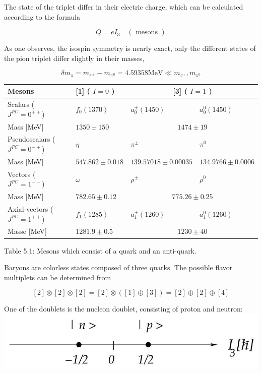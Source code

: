 \documentclass[10pt, letterpaper]{article}
\begin{document}
The state of the triplet differ in their electric charge, which can be calculated according to the formula

$$
Q=e I_{3} \quad(\text { mesons })
$$

As one observes, the isospin symmetry is nearly exact, only the different states of the pion triplet differ slightly in their masses,

$$
\delta m_{\pi}=m_{\pi^{ \pm}}-m_{\pi^{0}}=4.59358 \mathrm{MeV} \ll m_{\pi^{ \pm}}, m_{\pi^{0}}
$$

\begin{center}
\begin{tabular}{|l|l|l|l|}
\hline
Mesons & [1] ( $I=0$ ) & \multicolumn{2}{|c|}{[3] ( $I=1$ )} \\
\hline
Scalars ( $J^{P C}=0^{++}$) & $f_{0}(1370)$ & $a_{0}^{ \pm}(1450)$ & $a_{0}^{0}(1450)$ \\
\hline
Mass [MeV] & $1350 \pm 150$ & \multicolumn{2}{|c|}{$1474 \pm 19$} \\
\hline
Pseudoscalars ( $J^{P C}=0^{-+}$) & $\eta$ & $\pi^{ \pm}$ & $\pi^{0}$ \\
\hline
Mass [MeV] & $547.862 \pm 0.018$ & $139.57018 \pm 0.00035$ & $134.9766 \pm 0.0006$ \\
\hline
Vectors ( $J^{P C}=1^{--}$) & $\omega$ & $\rho^{ \pm}$ & $\rho^{0}$ \\
\hline
Mass [MeV] & $782.65 \pm 0.12$ & \multicolumn{2}{|c|}{$775.26 \pm 0.25$} \\
\hline
Axial-vectors ( $J^{P C}=1^{++}$) & $f_{1}(1285)$ & $a_{1}^{ \pm}(1260)$ & $a_{1}^{0}(1260)$ \\
\hline
Masse [MeV] & $1281.9 \pm 0.5$ & \multicolumn{2}{|c|}{$1230 \pm 40$} \\
\hline
\end{tabular}
\end{center}

Table 5.1: Mesons which consist of a quark and an anti-quark.

Baryons are colorless states composed of three quarks. The possible flavor multiplets can be determined from

$$
[2] \otimes[2] \otimes[2]=[2] \otimes([1] \oplus[3])=[2] \oplus[2] \oplus[4]
$$

One of the doublets is the nucleon doublet, consisting of proton and neutron:\\
\includegraphics[scale=0.3, center]{2025_05_20_8618f55a41bfe980b4b2g-66(1)}
\end{document}
